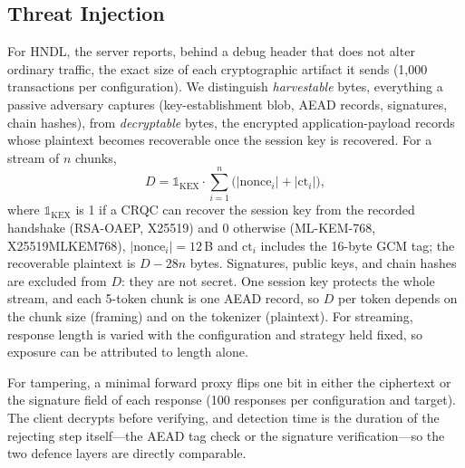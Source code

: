 \documentclass[conference]{IEEEtran}
\begin{document}
\subsection{Threat Injection}
For HNDL, the server reports, behind a debug header that does not alter ordinary traffic, the exact
size of each cryptographic artifact it sends (1,000 transactions per configuration). We distinguish
\emph{harvestable} bytes, everything a passive adversary captures (key-establishment blob, AEAD
records, signatures, chain hashes), from \emph{decryptable} bytes, the encrypted application-payload
records whose plaintext becomes recoverable once the session key is recovered. For a stream of $n$
chunks,
\begin{equation}
D = \mathbb{1}_{\mathrm{KEX}}\cdot\sum_{i=1}^{n}\bigl(|\text{nonce}_i| + |\text{ct}_i|\bigr),
\end{equation}
where $\mathbb{1}_{\mathrm{KEX}}$ is 1 if a CRQC can recover the session key from the recorded handshake
(RSA-OAEP, X25519) and 0 otherwise (ML-KEM-768, X25519MLKEM768), $|\text{nonce}_i|=12$\,B and $\text{ct}_i$ includes the 16-byte GCM tag; the recoverable
plaintext is $D-28n$ bytes. Signatures, public keys, and chain hashes are excluded from $D$: they are
not secret. One session key protects the whole stream, and each 5-token chunk is one AEAD record, so
$D$ per token depends on the chunk size (framing) and on the tokenizer (plaintext). For streaming, response length is varied with the
configuration and strategy held fixed, so exposure can be attributed to length alone.

For tampering, a minimal forward proxy flips one bit in either the ciphertext or the signature field of
each response (100 responses per configuration and target). The client decrypts before verifying, and
detection time is the duration of the rejecting step itself---the AEAD tag check or the signature
verification---so the two defence layers are directly comparable.
\end{document}
